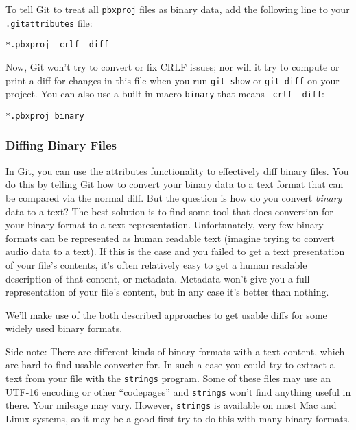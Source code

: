 \documentclass[a4paper]{book}
\begin{document}
To tell Git to treat all \texttt{pbxproj} files as binary data, add the following line to your \texttt{.gitattributes} file:

\begin{shaded}\begin{verbatim}
*.pbxproj -crlf -diff
\end{verbatim}\end{shaded}

Now, Git won't try to convert or fix CRLF issues; nor will it try to compute or print a diff for changes in this file when you run \texttt{git show} or \texttt{git diff} on your project. You can also use a built-in macro \texttt{binary} that means \texttt{-crlf -diff}:

\begin{shaded}\begin{verbatim}
*.pbxproj binary
\end{verbatim}\end{shaded}

\subsubsection{Diffing Binary Files}

In Git, you can use the attributes functionality to effectively diff binary files. You do this by telling Git how to convert your binary data to a text format that can be compared via the normal diff. But the question is how do you convert \emph{binary} data to a text? The best solution is to find some tool that does conversion for your binary format to a text representation. Unfortunately, very few binary formats can be represented as human readable text (imagine trying to convert audio data to a text). If this is the case and you failed to get a text presentation of your file's contents, it's often relatively easy to get a human readable description of that content, or metadata. Metadata won't give you a full representation of your file's content, but in any case it's better than nothing.

We'll make use of the both described approaches to get usable diffs for some widely used binary formats.

Side note: There are different kinds of binary formats with a text content, which are hard to find usable converter for. In such a case you could try to extract a text from your file with the \texttt{strings} program. Some of these files may use an UTF-16 encoding or other “codepages” and \texttt{strings} won't find anything useful in there. Your mileage may vary. However, \texttt{strings} is available on most Mac and Linux systems, so it may be a good first try to do this with many binary formats.
\end{document}
